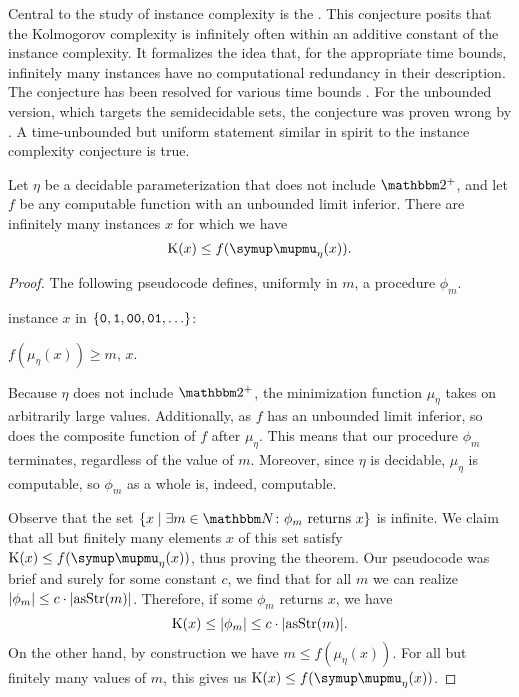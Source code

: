 Central to the study of instance complexity is the  \parencite{orponen1994instance}.
This conjecture posits that the Kolmogorov complexity is infinitely often within an additive constant of the instance complexity.
It formalizes the idea that, for the appropriate time bounds, infinitely many instances have no computational redundancy in their description.
The conjecture has been resolved for various time bounds \parencite{fortnow1996resource,buhrman1996random}.
For the unbounded version, which targets the semidecidable sets, the conjecture was proven wrong by \textcite{kummer1996kolmogorov}.
A time-unbounded but uniform statement similar in spirit to the instance complexity conjecture is true.
\begin{theorem}
\label{thm:parameterizedicc}%
  Let $\eta$ be a decidable parameterization that does not include $\binary^+$, and let $f$ be any computable function with an unbounded limit inferior.
  There are infinitely many instances $x$ for which we have
  \begin{equation*}
    \KC(x) \le f(\mu_\eta(x)).
  \end{equation*}
\end{theorem}
\begin{proof}
  The following pseudocode defines, uniformly in $m$, a procedure $\phi_m$.
  \begin{codelisting}
  \item
     instance $x$ in $\{\bits{0}, \bits{1}, \bits{00}, \bits{01}, \ldots\}$:
    \begin{codelisting}
      \item {} $f(\mu_\eta(x)) \ge m$,  $x$.
    \end{codelisting}
  \end{codelisting}

  Because $\eta$ does not include $\binary^+$, the minimization function $\mu_\eta$ takes on arbitrarily large values.
  Additionally, as $f$ has an unbounded limit inferior, so does the composite function of $f$ after $\mu_\eta$.
  This means that our procedure $\phi_m$ terminates, regardless of the value of $m$.
  Moreover, since $\eta$ is decidable, $\mu_\eta$ is computable, so $\phi_m$ as a whole is, indeed, computable.

  Observe that the set $\{x \st \exists m \in \bbN\colon \text{$\phi_m$ returns $x$}\}$ is infinite.
  We claim that all but finitely many elements $x$ of this set satisfy $\KC(x) \le f(\mu_\eta(x))$, thus proving the theorem.
  Our pseudocode was brief and surely for some constant $c$, we find that for all $m$ we can realize ${\lvert\phi_m\rvert} \le c \cdot {\lvert\operatorname{asStr}(m)\rvert}$.
  Therefore, if some $\phi_m$ returns $x$, we have
  \begin{equation*}
    \operatorname{K}(x) \le {\lvert\phi_m\rvert} \le c \cdot {\lvert\operatorname{asStr}(m)\rvert}.
  \end{equation*}
  On the other hand, by construction we have $m \le f(\mu_\eta(x))$.
  For all but finitely many values of $m$, this gives us $\KC(x) \le f(\mu_\eta(x))$.
\end{proof}

